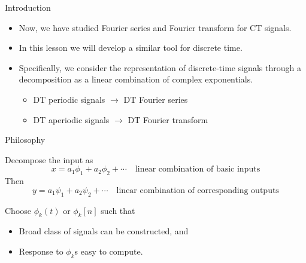 
\begin{frame}{Introduction}
    \begin{itemize}[<+->]
        \item Now, we have studied Fourier series and Fourier transform for CT signals.
        \item In this lesson we will develop a similar tool for discrete time.
        \item Specifically, we consider the representation of discrete-time signals through a decomposition as a linear combination of complex exponentials.
            \begin{itemize}
                \item DT periodic signals $\rightarrow$ DT Fourier series
                \item DT aperiodic signals $\rightarrow$ DT Fourier transform
            \end{itemize}
    \end{itemize}
\end{frame}


\begin{frame}{Philosophy}
        \begin{center}
        \end{center}
        Decompose the input as
            \begin{equation*}
                x = a_1\phi_1 + a_2\phi_2 + \cdots \quad \text{linear combination of basic inputs}
            \end{equation*}
        Then
            \begin{equation*}
                y = a_1\psi_1 + a_2\psi_2 + \cdots \quad \text{linear combination of corresponding outputs}
            \end{equation*}

        Choose $\phi_k(t)$ or $\phi_k[n]$ such that
        \begin{itemize}
            \item Broad class of signals can be constructed, and
            \item Response to $\phi_k$s easy to compute.
        \end{itemize}
\end{frame}

